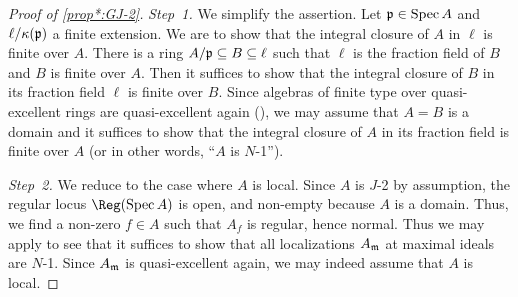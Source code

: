 \begin{proof}[Proof of \cref{prop*:GJ-2}]
	\emph{Step~1.} We simplify the assertion. Let $\mathfrak{p}\in\operatorname{Spec} A$ and $\ell/\kappa(\mathfrak{p})$ a finite extension. We are to show that the integral closure of $A$ in $\ell$ is finite over $A$. There is a ring $A/\mathfrak{p}\subseteq B\subseteq \ell$ such that $\ell$ is the fraction field of $B$ and $B$ is finite over $A$. Then it suffices to show that the integral closure of $B$ in its fraction field $\ell$ is finite over $B$. Since algebras of finite type over quasi-excellent rings are quasi-excellent again (), we may assume that $A=B$ is a domain and it suffices to show that the integral closure of $A$ in its fraction field is finite over $A$ (or in other words, \enquote{$A$ is $N$-1}).
	
	\emph{Step~2.} We reduce to the case where $A$ is local. Since $A$ is $J$-2 by assumption, the regular locus $\Reg(\Spec A)$ is open, and non-empty because $A$ is a domain. Thus, we find a non-zero $f\in A$ such that $A_f$ is regular, hence normal. Thus we may apply  to see that it suffices to show that all localizations $A_{\mathfrak{m}}$ at maximal ideals are $N$-1. Since $A_{\mathfrak{m}}$ is quasi-excellent again, we may indeed assume that $A$ is local.
	

\end{proof}
